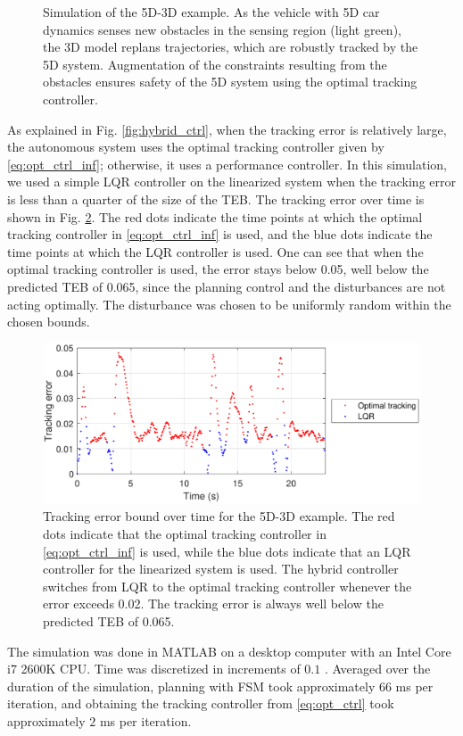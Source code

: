 \begin{figure}
\begin{subfigure}[t]{0.49\columnwidth}
  \end{subfigure}
  \caption{Simulation of the 5D-3D example. As the vehicle with 5D car dynamics senses new obstacles in the sensing region (light green), the 3D model replans trajectories, which are robustly tracked by the 5D system. Augmentation of the constraints resulting from the obstacles ensures safety of the 5D system using the optimal tracking controller. } \label{fig:5D3Dsim}
\end{figure}

As explained in Fig. \ref{fig:hybrid_ctrl}, when the tracking error is relatively large, the autonomous system uses the optimal tracking controller given by \eqref{eq:opt_ctrl_inf}; otherwise, it uses a performance controller. 
In this simulation, we used a simple LQR controller on the linearized system when the tracking error is less than a quarter of the size of the TEB.
The tracking error over time is shown in Fig. \ref{fig:P5D_Dubins_tracking_error}.
The red dots indicate the time points at which the optimal tracking controller in \eqref{eq:opt_ctrl_inf} is used, and the blue dots indicate the time points at which the LQR controller is used. 
One can see that when the optimal tracking controller is used, the error stays below 0.05, well below the predicted TEB of 0.065, since the planning control and the disturbances are not acting optimally.
The disturbance was chosen to be uniformly random within the chosen bounds.

\begin{figure}
  \includegraphics[width=\columnwidth]{fig/P5D_Dubins/tracking_error}
  \caption{Tracking error bound over time for the 5D-3D example. The red dots indicate that the optimal tracking controller in \eqref{eq:opt_ctrl_inf} is used, while the blue dots indicate that an LQR controller for the linearized system is used. The hybrid controller switches from LQR to the optimal tracking controller whenever the error exceeds 0.02. The tracking error is always well below the predicted TEB of 0.065.}
  \label{fig:P5D_Dubins_tracking_error}
\end{figure}

The simulation was done in MATLAB on a desktop computer with an Intel Core i7 2600K CPU.
Time was discretized in increments of $0.1$ .
Averaged over the duration of the simulation, planning with FSM took approximately $66$ ms per iteration, and obtaining the tracking controller from \eqref{eq:opt_ctrl} took approximately $2$ ms per iteration.

